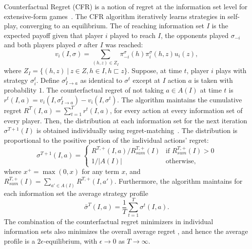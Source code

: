 \documentclass[letterpaper]{article}
\newcommand{\defword}[1]{\textbf{\boldmath{#1}}}
\begin{document}
Counterfactual Regret (CFR) is a notion of regret at the information set level for extensive-form games~\cite{CFR}. 
The CFR algorithm iteratively learns strategies in self-play, converging to an equilibrium. 
The \defword{counterfactual value} of reaching information set $I$ is the expected payoff given that player $i$ played to reach $I$, the opponents played 
$\sigma_{-i}$ and both players played $\sigma$ after $I$ was reached:
\begin{equation}
\label{eq:cfv}
v_i(I,\sigma) = \sum_{(h,z) \in Z_I} \pi^{\sigma}_{-i}(h) \pi^{\sigma}_{i}(h,z) u_i(z), 
\end{equation}
where $Z_I = \{ (h,z)~|~z \in Z, h \in I, h \sqsubset z \}$.
Suppose, at time $t$, player $i$ plays with strategy $\sigma^t_i$. 
Define $\sigma^t_{I \rightarrow a}$ as identical to $\sigma^t$ except at $I$ action $a$ is taken with probability $1$. 
The counterfactual regret of not taking $a \in A(I)$ at time $t$ is $r^t(I,a) = v_i(I,\sigma^t_{I \rightarrow a}) - v_i(I,\sigma^t)$. 
The algorithm maintains the cumulative regret $R^T(I,a) = \sum_{t=1}^T r^t(I,a)$, for every action at every information set of every player. 
Then, the distribution at each information set for the next iteration $\sigma^{T+1}(I)$ is obtained individually using 
regret-matching~\cite{Hart00}. The distribution is proportional to the positive portion of the individual actions' regret:
\begin{equation*}
\label{eq:rm}
\sigma^{T+1}(I,a) = \left\{
\begin{array}{ll}
R^{T,+}(I,a) / R^{T,+}_{sum}(I) & \mbox{if } R^{T,+}_{sum}(I) > 0 \\ 
1 / |A(I)|                   & \mbox{otherwise,}
\end{array} \right.
\end{equation*}
where $x^+ = \max(0,x)$ for any term $x$, and $R^{T,+}_{sum}(I) = \sum_{a' \in A(I)} R^{T,+}(I,a')$. Furthermore, the algorithm maintains for each information set the average strategy profile
\begin{equation}
\bar{\sigma}^T(I,a) = \frac{1}{T}\sum_{t=1}^T \sigma^t(I,a).
\end{equation}
The combination of the counterfactual regret minimizers in individual information sets also minimizes the overall average regret \cite{CFR}, and hence the average profile is a $2\epsilon$-equilibrium, with $\epsilon \rightarrow 0$
as $T \rightarrow \infty$.
\end{document}
